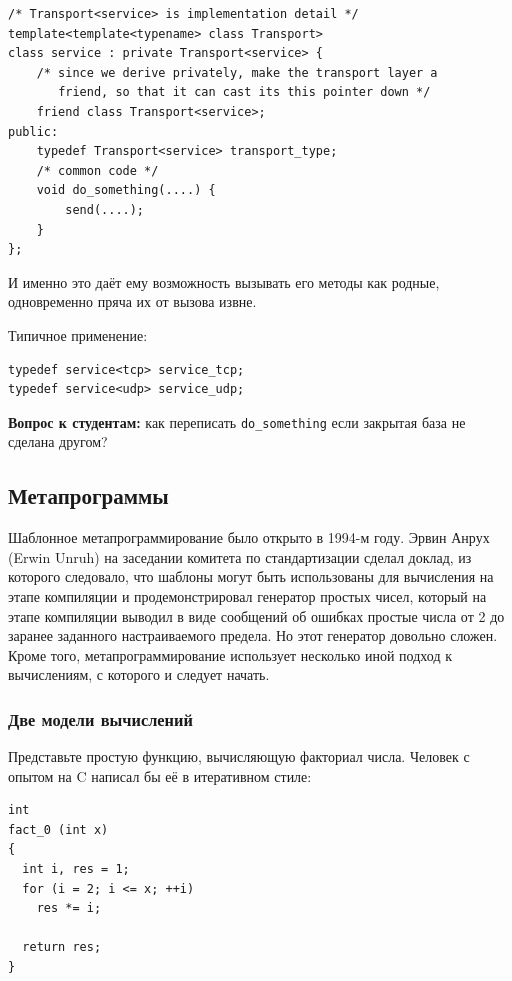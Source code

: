 \documentclass[a4paper,12pt,oneside]{article}
\newif\ifanswers
\begin{document}
\begin{lstlisting}
/* Transport<service> is implementation detail */
template<template<typename> class Transport>
class service : private Transport<service> {
    /* since we derive privately, make the transport layer a 
       friend, so that it can cast its this pointer down */
    friend class Transport<service>;
public:
    typedef Transport<service> transport_type;
    /* common code */
    void do_something(....) { 
        send(....);
    }
};
\end{lstlisting}

И именно это даёт ему возможность вызывать его методы как родные, одновременно пряча их от вызова извне.

Типичное применение:

\begin{lstlisting}
typedef service<tcp> service_tcp;
typedef service<udp> service_udp;
\end{lstlisting}

\textbf{Вопрос к студентам:} как переписать \lstinline!do_something! если закрытая база не сделана другом?

\ifanswers
Как вариант: \lstinline!transport_type::send(....);!
\fi

\pagebreak
\subsection{Метапрограммы}

Шаблонное метапрограммирование было открыто в 1994-м году. Эрвин Анрух (Erwin Unruh) на заседании комитета по стандартизации сделал доклад, из которого следовало, что шаблоны могут быть использованы для вычисления на этапе компиляции и продемонстрировал генератор простых чисел, который на этапе компиляции выводил в виде сообщений об ошибках простые числа от 2 до заранее заданного настраиваемого предела. Но этот генератор довольно сложен. Кроме того, метапрограммирование использует несколько иной подход к вычислениям, с которого и следует начать.

\subsubsection{Две модели вычислений}\label{ComputationModels}

Представьте простую функцию, вычисляющую факториал числа. Человек с опытом на C написал бы её в итеративном стиле:

\begin{lstlisting}
int
fact_0 (int x)
{
  int i, res = 1;
  for (i = 2; i <= x; ++i)
    res *= i;

  return res;
}
\end{lstlisting}
\end{document}
